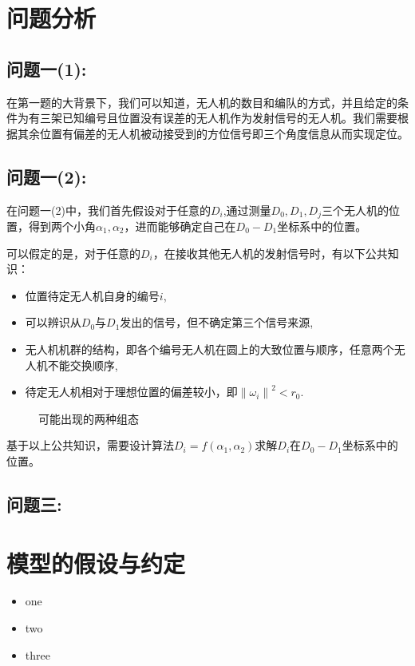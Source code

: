 \documentclass[withoutpreface,bwprint]{cumcmthesis} %
\begin{document}
	\section{问题分析}
		\subsection{问题一(1):}
		在第一题的大背景下，我们可以知道，无人机的数目和编队的方式，并且给定的条件为有三架已知编号且位置没有误差的无人机作为发射信号的无人机。我们需要根据其余位置有偏差的无人机被动接受到的方位信号即三个角度信息从而实现定位。
		\subsection{问题一(2):}
		在问题一(2)中，我们首先假设对于任意的$D_i$,通过测量$D_0,D_1,D_j$三个无人机的位置，得到两个小角$\alpha_1,\alpha_2$，进而能够确定自己在$D_0 - D_1$坐标系中的位置。
		
		可以假定的是，对于任意的$D_i$，在接收其他无人机的发射信号时，有以下公共知识：
		\begin{itemize}
			\item	位置待定无人机自身的编号$i$,
			\item	可以辨识从$D_0$与$D_1$发出的信号，但不确定第三个信号来源,
			\item	无人机机群的结构，即各个编号无人机在圆上的大致位置与顺序，任意两个无人机不能交换顺序,
			\item 	待定无人机相对于理想位置的偏差较小，即$ {\lVert \omega_i \rVert}^2 < r_0 $.
		\end{itemize}
		\begin{figure}[htb]
			\centering
			\caption{可能出现的两种组态}
			\label{fig1}
		\end{figure}
		基于以上公共知识，需要设计算法$D_i = f(\alpha_1, \alpha_2)$求解$D_i$在$D_0 - D_1$坐标系中的位置。
		\subsection{问题三:}
	\section{模型的假设与约定}
		\begin{itemize}
			\item{} one
			\item{} two
			\item{} three
		\end{itemize}
\end{document}
